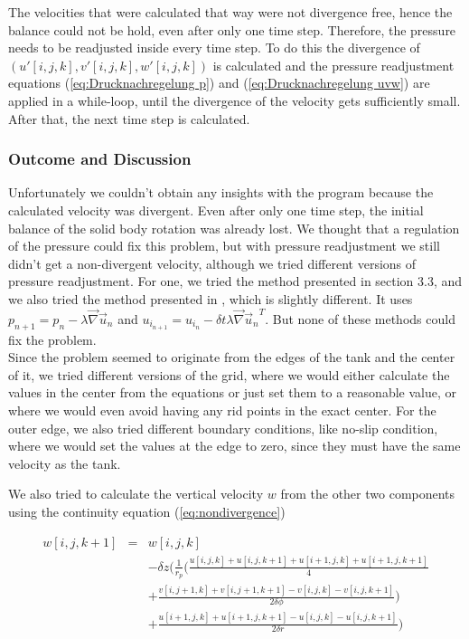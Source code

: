 \documentclass[12pt, a4paper]{article} %
\begin{document}
			The velocities that were calculated that way were not divergence free, hence the balance could not be hold, even after only one time step. Therefore, the pressure needs to be readjusted inside every time step. To do this the divergence of $\left(u'[i,j,k], v'[i,j,k], w'[i,j,k]\right)$ is calculated and the pressure readjustment equations (\ref{eq:Drucknachregelung p}) and (\ref{eq:Drucknachregelung uvw}) are applied in a while-loop, until the divergence of the velocity gets sufficiently small.
			After that, the next time step is calculated.
			
		\subsubsection{Outcome and Discussion}
			Unfortunately we couldn't obtain any insights with the program because the calculated velocity was divergent. Even after only one time step, the initial balance of the solid body rotation was already lost. We thought that a regulation of the pressure  could fix this problem, but with pressure readjustment we still  didn't get a non-divergent velocity, although we tried different versions of pressure readjustment. 
			For one, we tried the method presented in section 3.3, and we also tried the method presented in %
			, which is slightly different. It uses $p_{n+1} = p_n - \lambda \vec{\nabla} \vec{u}_n$ and $u_{i_{n+1}} = u_{i_{n}} - \delta t \lambda \vec{\nabla}{\vec{u}_n}^T$. But none of these methods could fix the problem.\\
			
			Since the problem seemed to originate from the edges of the tank and the center of it, we tried different versions of the grid, where we would either calculate the values in the center from the equations or just set them to a reasonable value, or where we would even avoid having any rid points in the exact center. For the outer edge, we also tried different boundary conditions, like no-slip condition, where we would set the values at the edge to zero, since they must have the same velocity as the tank.
			
			We also tried to calculate the vertical velocity $w$ from the other two components using the continuity equation (\ref{eq:nondivergence})
			
			\begin{eqnarray}
				w[i,j,k+1] &=& w[i,j,k]
				\nonumber \\
				&&- \delta z \Bigg( \frac{1}{r_p}\bigg( \frac{u[i,j,k]+u[i,j,k+1]+u[i+1,j,k]+u[i+1,j,k+1]}{4}
				\nonumber \\
				&&+ \frac{v[i,j+1,k]+v[i,j+1,k+1]-v[i,j,k]-v[i,j,k+1]}{2\delta\phi} \bigg) 
				\nonumber \\
				&&+\frac{u[i+1,j,k]+u[i+1,j,k+1]-u[i,j,k]-u[i,j,k+1]}{2\delta r} \Bigg)
				\label{eq: neues w_c}
			\end{eqnarray}
			
\end{document}
